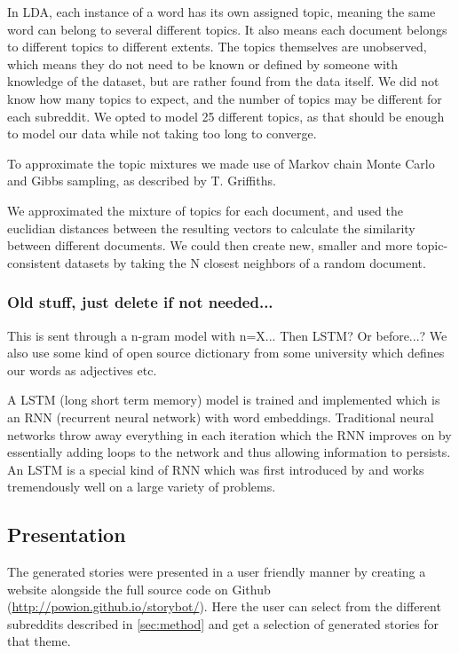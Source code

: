 \documentclass[12pt,a4paper,utf8]{article}
\begin{document}
In LDA, each instance of a word has its own assigned topic, meaning the same word can belong to several different topics. It also means each document belongs to different topics to different extents. The topics themselves are unobserved, which means they do not need to be known or defined by someone with knowledge of the dataset, but are rather found from the data itself. We did not know how many topics to expect, and the number of topics may be different for each subreddit. We opted to model 25 different topics, as that should be enough to model our data while not taking too long to converge.

To approximate the topic mixtures we made use of Markov chain Monte Carlo and Gibbs sampling, as described by T. Griffiths\cite{griffiths2002gibbs}.

We approximated the mixture of topics for each document, and used the euclidian distances between the resulting vectors to calculate the similarity between different documents. We could then create new, smaller and more topic-consistent datasets by taking the N closest neighbors of a random document. 

\subsubsection{Old stuff, just delete if not needed...}

This is sent through a n-gram model with n=X... Then LSTM? Or before...? We also use some kind of open source dictionary from some university which defines our words as adjectives etc.

A LSTM (long short term memory) model is trained and implemented which is an RNN (recurrent neural network) with word embeddings. Traditional neural networks throw away everything in each iteration which the RNN improves on by essentially adding loops to the network and thus allowing information to persists\autocite{LSTM}. An LSTM is a special kind of RNN which was first introduced by \textcite{LSTMarticle} and works tremendously well on a large variety of problems\autocite{LSTM}.

\subsection{Presentation}
The generated stories were presented in a user friendly manner by creating a website alongside the full source code on Github (\url{http://powion.github.io/storybot/}). Here the user can select from the different subreddits described in \autoref{sec:method} and get a selection of generated stories for that theme.
\end{document}
